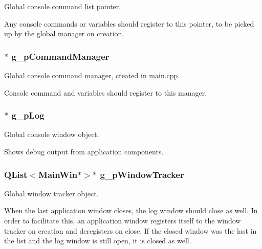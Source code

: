 Global console command list pointer. 

Any console commands or variables should register to this pointer, to be picked up by the global manager on creation. \hypertarget{group___global_variables_ga4d39defaa5d22f29bde4c75d590bd0fe}{
\subsubsection[{g\-\_\-p\-Command\-Manager}]{$\ast$ g\-\_\-p\-Command\-Manager}}\label{group___global_variables_ga4d39defaa5d22f29bde4c75d590bd0fe}


Global console command manager, created in main.\-cpp. 

Console command and variables should register to this manager. \hypertarget{group___global_variables_gae2d76408535137add345d6e4258c5a07}{
\subsubsection[{g\-\_\-p\-Log}]{$\ast$ g\-\_\-p\-Log}}\label{group___global_variables_gae2d76408535137add345d6e4258c5a07}


Global console window object. 

Shows debug output from application components. \hypertarget{group___global_variables_gab5d481b5087f9956e533067ad8001d78}{
\subsubsection[{g\-\_\-p\-Window\-Tracker}]{\setlength{\rightskip}{0pt plus 5cm}Q\-List$<${\bf Main\-Win}$\ast$$>$$\ast$ g\-\_\-p\-Window\-Tracker}}\label{group___global_variables_gab5d481b5087f9956e533067ad8001d78}


Global window tracker object. 

When the last application window closes, the log window should close as well. In order to facilitate this, an application window registers itself to the window tracker on creation and deregisters on close. If the closed window was the last in the list and the log window is still open, it is closed as well. 